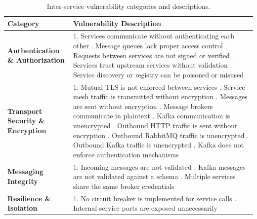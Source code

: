 \documentclass[preprint,12pt]{elsarticle}
\newcommand{\new}[1]{#1}
\newcommand{\safefixtablestyle}{%
  \small
  \setlength{\tabcolsep}{5pt}
  \renewcommand{\arraystretch}{1.15}
}
\begin{document}
\begin{table}[!t]
\centering
\caption{Inter-service vulnerability categories and descriptions.}
\label{tab:isv_categories}
\safefixtablestyle
\renewcommand{\arraystretch}{1.25}
\begin{tabularx}{\linewidth}{@{} L{3.6cm} Y @{}}
\toprule
\textbf{Category} & \textbf{Vulnerability Description} \\
\midrule
\textbf{Authentication \& Authorization} &
1. Services communicate without authenticating each other . Message queues lack proper access control . Requests between services are not signed or verified . Services trust upstream services without validation . Service discovery or registry can be poisoned or misused \\
\midrule
\textbf{Transport Security \& Encryption} &
1. Mutual TLS is not enforced between services \newline
\new{2. Service mesh traffic is transmitted without encryption} . Messages are sent without encryption . Message brokers communicate in plaintext . Kafka communication is unencrypted . Outbound HTTP traffic is sent without encryption . Outbound RabbitMQ traffic is unencrypted . Outbound Kafka traffic is unencrypted . Kafka does not enforce authentication mechanisms \\
\midrule
\textbf{Messaging Integrity} &
1. Incoming messages are not validated . Kafka messages are not validated against a schema . Multiple services share the same broker credentials \\
\midrule
\textbf{Resilience \& Isolation} &
1. No circuit breaker is implemented for service calls . Internal service ports are exposed unnecessarily \\
\bottomrule
\end{tabularx}
\end{table}
\end{document}
